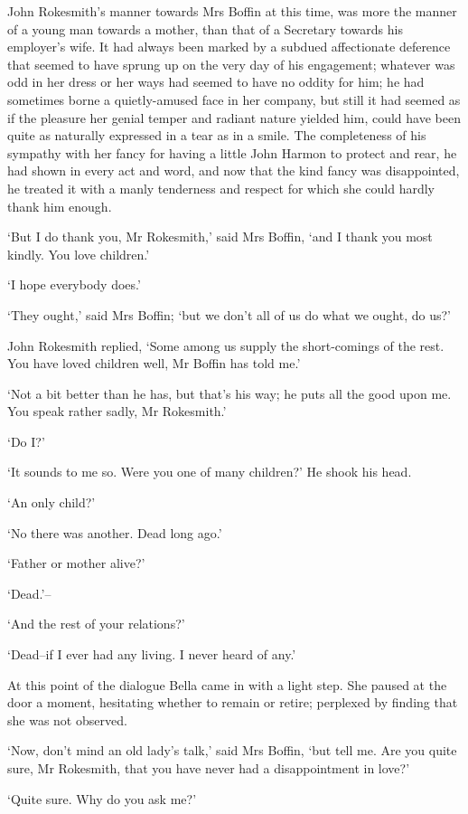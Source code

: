 John Rokesmith’s manner towards Mrs Boffin at this time, was more the
manner of a young man towards a mother, than that of a Secretary towards
his employer’s wife. It had always been marked by a subdued affectionate
deference that seemed to have sprung up on the very day of his
engagement; whatever was odd in her dress or her ways had seemed to have
no oddity for him; he had sometimes borne a quietly-amused face in her
company, but still it had seemed as if the pleasure her genial temper
and radiant nature yielded him, could have been quite as naturally
expressed in a tear as in a smile. The completeness of his sympathy with
her fancy for having a little John Harmon to protect and rear, he
had shown in every act and word, and now that the kind fancy was
disappointed, he treated it with a manly tenderness and respect for
which she could hardly thank him enough.

‘But I do thank you, Mr Rokesmith,’ said Mrs Boffin, ‘and I thank you
most kindly. You love children.’

‘I hope everybody does.’

‘They ought,’ said Mrs Boffin; ‘but we don’t all of us do what we ought,
do us?’

John Rokesmith replied, ‘Some among us supply the short-comings of the
rest. You have loved children well, Mr Boffin has told me.’

‘Not a bit better than he has, but that’s his way; he puts all the good
upon me. You speak rather sadly, Mr Rokesmith.’

‘Do I?’

‘It sounds to me so. Were you one of many children?’ He shook his head.

‘An only child?’

‘No there was another. Dead long ago.’

‘Father or mother alive?’

‘Dead.’--

‘And the rest of your relations?’

‘Dead--if I ever had any living. I never heard of any.’

At this point of the dialogue Bella came in with a light step. She
paused at the door a moment, hesitating whether to remain or retire;
perplexed by finding that she was not observed.

‘Now, don’t mind an old lady’s talk,’ said Mrs Boffin, ‘but tell me. Are
you quite sure, Mr Rokesmith, that you have never had a disappointment
in love?’

‘Quite sure. Why do you ask me?’

